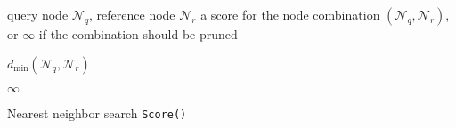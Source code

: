 \begin{algorithm}[tb]
  \begin{algorithmic}
     query node $\mathscr{N}_q$, reference node
$\mathscr{N}_r$
     a score for the node combination $(\mathscr{N}_q,
\mathscr{N}_r)$, or $\infty$ if the combination should be pruned

    \medskip

      \RETURN $d_{\min}(\mathscr{N}_q, \mathscr{N}_r)$
    \ENDIF

    \RETURN $\infty$
  \end{algorithmic}

  \caption{Nearest neighbor search \texttt{Score()}}
  \label{alg:nn_score}
\end{algorithm}




